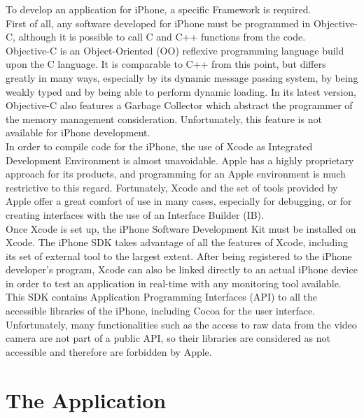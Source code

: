 To develop an application for iPhone, a specific Framework is required.\\

First of all, any software developed for iPhone must be programmed in Objective-C, although it is possible to call C and C++ functions from the code.\\

Objective-C is an Object-Oriented (OO) reflexive programming language build upon the C language. It is comparable to C++ from this point, but differs greatly in many ways, especially by its dynamic message passing system, by being weakly typed and by being able to perform dynamic loading. In its latest version, Objective-C also features a Garbage Collector which abstract the programmer of the memory management consideration. Unfortunately, this feature is not available for iPhone development.\\

In order to compile code for the iPhone, the use of Xcode as Integrated Development Environment is almost unavoidable. Apple has a highly proprietary approach for its products, and programming for an Apple environment is much restrictive to this regard. Fortunately, Xcode and the set of tools provided by Apple offer a great comfort of use in many cases, especially for debugging, or for creating interfaces with the use of an Interface Builder (IB).\\

Once Xcode is set up, the iPhone Software Development Kit must be installed on Xcode. The iPhone SDK takes advantage of all the features of Xcode, including its set of external tool to the largest extent. After being registered to the iPhone developer's program, Xcode can also be linked directly to an actual iPhone device in order to test an application in real-time with any monitoring tool available.\\

This SDK contains Application Programming Interfaces (API) to all the accessible libraries of the iPhone, including Cocoa for the user interface. Unfortunately, many functionalities such as the access to raw data from the video camera are not part of a public API, so their libraries are considered as not accessible and therefore are forbidden by Apple.

\section{The Application}
\label{sec:the_application}

